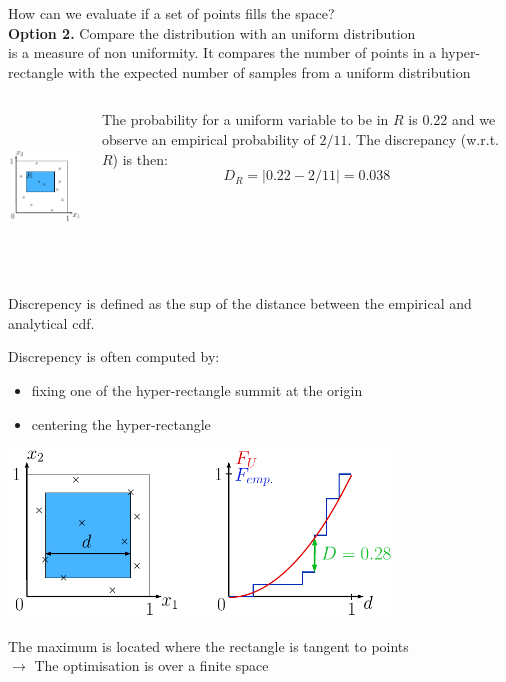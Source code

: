 \documentclass{beamer}
\begin{document}
\begin{frame}{}
How can we evaluate if a set of points fills the space?\\ \vspace{2mm}
\textbf{Option 2.} Compare the distribution with an uniform distribution\\ \vspace{2mm}
 is a measure of non uniformity. It compares the number of points in a hyper-rectangle with the expected number of samples from a uniform distribution
\vspace{-2mm}
\begin{columns}[c]
\column{4cm}
\begin{center}
\includegraphics[height=4cm]{figures/latexdraw/discrepency}
\end{center}
\column{6cm}
\vspace{1mm}
The probability for a uniform variable to be in $R$ is 0.22 and we observe an empirical probability of $2/11$. The discrepancy (w.r.t. $R$) is then:
$$D_R = |0.22-2/11| = 0.038$$
\end{columns}
\vspace{2mm}
Discrepency is defined as the sup of the distance between the empirical and analytical cdf.
\end{frame}

\begin{frame}{}
Discrepency is often computed by:
\begin{itemize}
 	\item fixing one of the hyper-rectangle summit at the origin
 	\item centering the hyper-rectangle
 \end{itemize}
\begin{center}
\includegraphics[height=4.5cm]{figures/latexdraw/discrepency3}
\end{center}
The maximum is located where the rectangle is tangent to points\\
$\rightarrow$ The optimisation is over a finite space
\end{frame}
\end{document}
